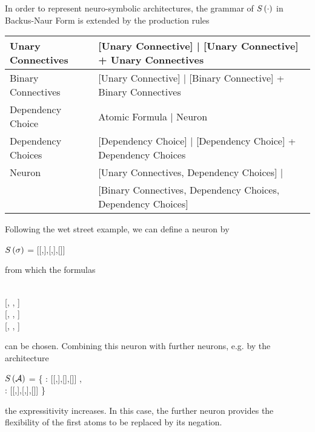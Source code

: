 In order to represent neuro-symbolic architectures, the grammar of $S\left(\cdot\right)$ in Backus-Naur Form is extended by the production rules \\
\begin{tabular}{|l|l|}
  	\hline
 	Unary Connectives & [Unary Connective] | [Unary Connective] + Unary Connectives \\
  	\hline
 	Binary Connectives & [Unary Connective] | [Binary Connective] + Binary Connectives \\
  	\hline
 	Dependency Choice & Atomic Formula | Neuron \\ 
  	\hline
	Dependency Choices & [Dependency Choice] | [Dependency Choice] + Dependency Choices \\ 
	\hline
	Neuron & [Unary Connectives, Dependency Choices] | \\
	&  [Binary Connectives, Dependency Choices, Dependency Choices] \\
	\hline
\end{tabular}


\begin{example}
	Following the wet street example, we can define a neuron by
	\begin{centeredcode}
		$S\left(\sigma\right)$ = [[,],[,],[]] 
	\end{centeredcode}
	from which the formulas 
	\begin{centeredcode}
		[\stringof{imp}, \stringof{Wet}, \stringof{Street}] \\
		\hspace{0.25cm} [, , \stringof{Street}] \\
		\hspace{1cm}[, , \stringof{Street}] \\
		\hspace{1cm}[, , \stringof{Street}]		
	\end{centeredcode}
	can be chosen.
	Combining this neuron with further neurons, e.g. by the architecture
	\begin{centeredcode}
		$S\left(\mathcal{A}\right)$ = \{ : [[,],[],[]] , \\
		\hspace{1.8cm}: [[,],[,],[]] \}
	\end{centeredcode}
	the expressitivity increases.
	In this case, the further neuron provides the flexibility of the first atoms to be replaced by its negation.	
\end{example}



